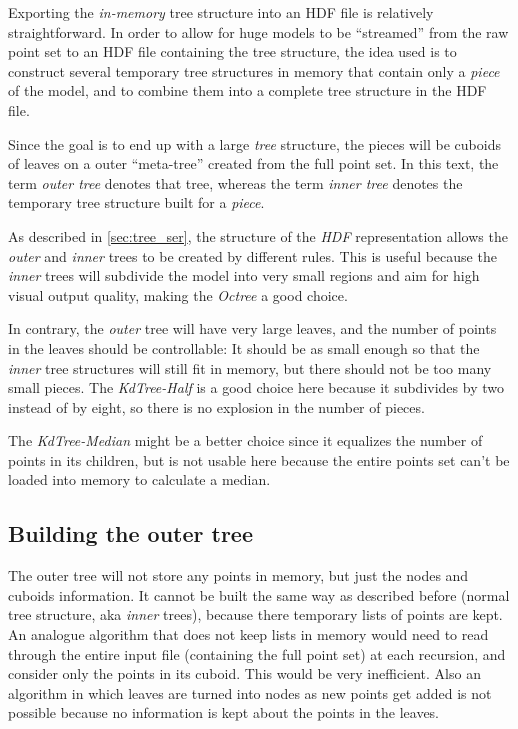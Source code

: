 \documentclass[a4paper,10pt,abstracton,notitlepage]{scrreprt}
\begin{document}
Exporting the \emph{in-memory} tree structure into an HDF file is relatively straightforward. In order to allow for huge models to be ``streamed'' from the raw point set to an HDF file containing the tree structure, the idea used is to construct several temporary tree structures in memory that contain only a \emph{piece} of the model, and to combine them into a complete tree structure in the HDF file.

Since the goal is to end up with a large \emph{tree} structure, the pieces will be cuboids of leaves on a outer ``meta-tree'' created from the full point set. In this text, the term \emph{outer tree} denotes that tree, whereas the term \emph{inner tree} denotes the temporary tree structure built for a \emph{piece}.

As described in \ref{sec:tree_ser}, the structure of the \emph{HDF} representation allows the \emph{outer} and \emph{inner} trees to be created by different rules. This is useful because the \emph{inner} trees will subdivide the model into very small regions and aim for high visual output quality, making the \emph{Octree} a good choice.

In contrary, the \emph{outer} tree will have very large leaves, and the number of points in the leaves should be controllable: It should be as small enough so that the \emph{inner} tree structures will still fit in memory, but there should not be too many small pieces. The \emph{KdTree-Half} is a good choice here because it subdivides by two instead of by eight, so there is no explosion in the number of pieces.

The \emph{KdTree-Median} might be a better choice since it equalizes the number of points in its children, but is not usable here because the entire points set can't be loaded into memory to calculate a median.

\subsection{Building the outer tree}
The outer tree will not store any points in memory, but just the nodes and cuboids information. It cannot be built the same way as described before (normal tree structure, aka \emph{inner} trees), because there temporary lists of points are kept. An analogue algorithm that does not keep lists in memory would need to read through the entire input file (containing the full point set) at each recursion, and consider only the points in its cuboid. This would be very inefficient. Also an algorithm in which leaves are turned into nodes as new points get added is not possible because no information is kept about the points in the leaves.
\end{document}
